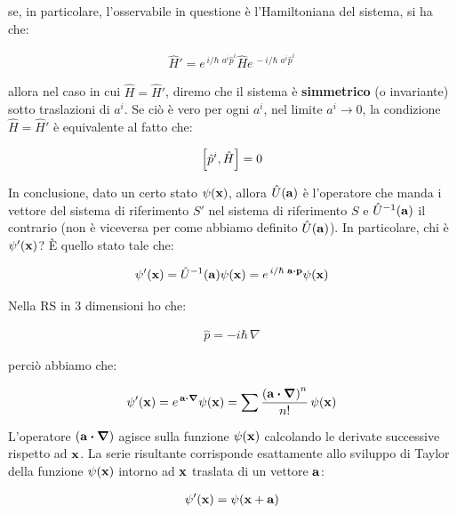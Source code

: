 	se, in particolare, l'osservabile in questione è l'Hamiltoniana del sistema, si ha che:
	
\begin{align*}
	\hat{H}' =  e^{\, i/\hbar \,\, a^i \hat{p}^i} \hat{H} e^{\, - i/\hbar \,\, a^i \hat{p}^i}
\end{align*}

	allora nel caso in cui $\hat{H} = \hat{H}'$, diremo che il sistema è \textbf{simmetrico} (o invariante) sotto traslazioni di $a^i$. Se ciò è vero per ogni $a^i$, nel limite $a^i \to 0$, la condizione $\hat{H} = \hat{H}'$ è equivalente al fatto che:
	
\begin{align*}
	\qty[\hat{p}^i, \hat{H}] = 0
\end{align*}

	In conclusione, dato un certo stato $\psi(\vb{x})$, allora $\hat{U}(\vb{a})$ è l'operatore che manda i vettore del sistema di riferimento $S'$ nel sistema di riferimento $S$ e $\hat{U}^{-1}(\vb{a})$ il contrario (non è viceversa per come abbiamo definito $\hat{U}(\vb{a})$). In particolare, chi è $\psi'(\vb{x})$? È quello stato tale che:
	
\begin{align*}
	\psi'(\vb{x}) = \hat{U}^{-1}(\vb{a})\psi(\vb{x}) = e^{ \, i/\hbar \,\, \vb{a} \vdot \vb{p}} \psi(\vb{x})
\end{align*}

	Nella RS in $3$ dimensioni ho che:

\begin{align*}
	\hat{p} = - i \hbar \, \nabla
\end{align*}

	perciò abbiamo che:
	
\begin{align*}
	\psi'(\vb{x}) = e^{\, \vb{a} \vdot \vb*{\nabla}} \psi(\vb{x}) = \sum \frac{\qty(\vb{a} \vdot \vb*{\nabla})^n}{n!} \, \psi(\vb{x})
\end{align*}

	L'operatore $\qty(\vb{a} \vdot \vb*{\nabla})$ agisce sulla funzione $\psi(\vb{x})$ calcolando le derivate successive rispetto ad $\vb{x}$. La serie risultante corrisponde esattamente allo sviluppo di Taylor della funzione $\psi(\vb{x})$ intorno ad $\vb{x}$ traslata di un vettore $\vb{a}$:
	
\begin{align*}
	\psi'(\vb{x}) = \psi(\vb{x} + \vb{a})
\end{align*}

